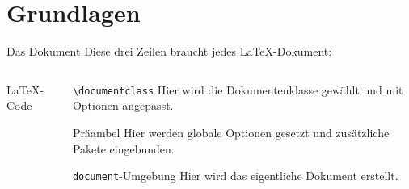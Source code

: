 \section{Grundlagen}

\begin{frame}[fragile]{Das Dokument}
  Diese drei Zeilen braucht jedes \LaTeX-Dokument:
  \begin{columns}[T]
    \begin{column}{0.47\textwidth}
      \begin{block}{\LaTeX-Code}
      \end{block}
    \end{column}
    \begin{column}{0.47\textwidth}
      \begin{block}{\texttt{\textbackslash documentclass}}
        Hier wird die Dokumentenklasse gewählt und mit Optionen angepasst.
      \end{block}
      \begin{block}{Präambel}
        Hier werden globale Optionen gesetzt und zusätzliche Pakete eingebunden.
      \end{block}
      \begin{block}{\texttt{document}-Umgebung}
        Hier wird das eigentliche Dokument erstellt.
      \end{block}
    \end{column}
  \end{columns}
\end{frame}

